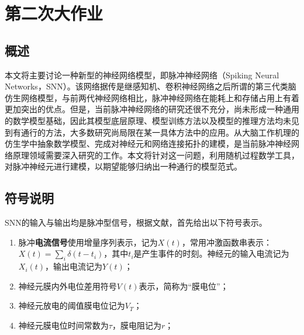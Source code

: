 \documentclass[11pt]{article}
\begin{document}
\section{第二次大作业}
\subsection{概述}
本文将主要讨论一种新型的神经网络模型，即脉冲神经网络（Spiking Neural Networks，SNN）。该网络据传是继感知机、卷积神经网络之后所谓的第三代类脑仿生网络模型，与前两代神经网络相比，脉冲神经网络在能耗上和存储占用上有着更加突出的优点。但是，当前脉冲神经网络的研究还很不充分，尚未形成一种通用的数学模型基础，因此其模型底层原理、模型训练方法以及模型的推理方法均未见到有通行的方法，大多数研究尚局限在某一具体方法中的应用。从大脑工作机理的仿生学中抽象数学模型、完成对神经元和网络连接拓扑的建模，是当前脉冲神经网络原理领域需要深入研究的工作。本文将针对这一问题，利用随机过程数学工具，对脉冲神经元进行建模，以期望能够归纳出一种通行的模型范式。
\subsection{符号说明}
SNN的输入与输出均是脉冲型信号，根据文献\cite{jaegerEncyclopediaComputationalNeuroscience2015}，首先给出以下符号表示。
\begin{enumerate}
  \item 脉冲\textbf{电流信号}使用增量序列表示，记为$X(t)$，常用冲激函数串表示：$X(t)=\sum\limits_i\delta(t-t_i)$，其中$t_i$是产生事件的时刻。神经元的输入电流记为$X_i(t)$，输出电流记为$Y(t)$；
  \item 神经元膜内外电位差用符号$V(t)$表示，简称为“膜电位”；
  \item 神经元放电的阈值膜电位记为$V_T$；
  \item 神经元膜电位时间常数为$\tau$，膜电阻记为$r$；
\end{enumerate}
\end{document}
